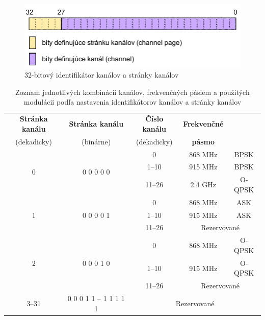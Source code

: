 \begin{figure}[htbp]
\begin{center}
\includegraphics[width=120mm]{figures/channel_page}
\caption{32-bitový identifikátor kanálov a stránky kanálov}
\label{fig:channel_page}
\end{center}
\end{figure}
\begin{table}[htbp]
\begin{center}
\begin{tabular}{|c|c|c|c|c|}
  \hline
  \textbf{Stránka kanálu} & \textbf{Stránka kanálu} & \textbf{Číslo kanálu} & \textbf{Frekvenčné} & \\
  (dekadicky) & (binárne) & (dekadicky) & \textbf{pásmo} & \raisebox{1.5ex}{\textbf{Modulácia}} \\
  \hline
  \hline
  \multirow{3}{*}{0} & \multirow{3}{*}{0 0 0 0 0} & 0 & 868 MHz & BPSK \\
  \cline{3-5}
  & & 1--10 & 915 MHz & BPSK \\
  \cline{3-5}
  & & 11--26 &  2.4 GHz & O-QPSK \\ [0.5ex]
  \hline
  \multirow{3}{*}{1} & \multirow{3}{*}{0 0 0 0 1} & 0 & 868 MHz & ASK \\
  \cline{3-5}
  & & 1--10 & 915 MHz & ASK \\
  \cline{3-5}
  & & 11--26 & \multicolumn{2}{|c|}{Rezervované} \\ [0.5ex]
  \hline
  \multirow{3}{*}{2} & \multirow{3}{*}{0 0 0 1 0} & 0 & 868 MHz & O-QPSK \\
  \cline{3-5}
  & & 1--10 & 915 MHz & O-QPSK \\
  \cline{3-5}
  & & 11--26 & \multicolumn{2}{|c|}{Rezervované} \\ [0.5ex]
  \hline
  3--31 & 0 0 0 1 1 -- 1 1 1 1 1 & \multicolumn{3}{|c|}{Rezervované} \\ [0.5ex]
  \hline
\end{tabular}
\caption{Zoznam jednotlivých kombinácii kanálov, frekvenčných pásiem a použitých modulácii podľa nastavenia identifikátorov kanálov a stránky kanálov}
\label{tab:channel_page}
\end{center}
\end{table}
